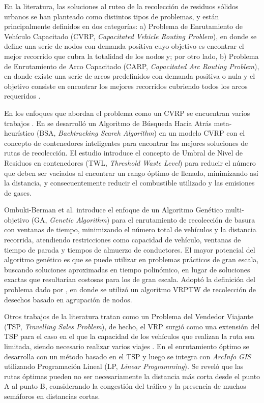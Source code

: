\documentclass[spanish, conference]{IEEEtran}
\begin{document}
En la literatura, las soluciones al ruteo de la recolección de residuos sólidos urbanos se han planteado como distintos tipos de problemas, y están principalmente definidos en dos categorías: a) Problema de Enrutamiento de Vehículo Capacitado (CVRP, \textit{Capacitated Vehicle Routing Problem}), en donde se define una serie de nodos con demanda positiva cuyo objetivo es encontrar el mejor recorrido que cubra la totalidad de los nodos y; por otro lado, b) Problema de Enrutamiento de Arco Capacitado (CARP, \textit{Capacitated Arc Routing Problem}), en donde existe una serie de arcos predefinidos con demanda positiva o nula y el objetivo consiste en encontrar los mejores recorridos cubriendo todos los arcos requeridos \cite{Tirkolaee2018ATime}.

En los enfoques que abordan el problema como un CVRP se encuentran varios trabajos \cite{Akhtar2017BacktrackingOptimization,Ombuki-Berman2007WASTEALGORITHMS,Kim2006WasteWindows,Billa2014GISOptimization,Karadimas2007OptimalAlgorithm}. En \cite{Akhtar2017BacktrackingOptimization} se desarrolló un Algoritmo de Búsqueda Hacia Atrás meta-heurístico (BSA, \textit{Backtracking Search Algorithm}) en un modelo CVRP con el concepto de contenedores inteligentes para encontrar las mejores soluciones de rutas de recolección. El estudio introduce el concepto de Umbral de Nivel de Residuos en contenedores (TWL, \textit{Threshold Waste Level}) para reducir el número que deben ser vaciados al encontrar un rango óptimo de llenado, minimizando así la distancia, y consecuentemente reducir el combustible utilizado y las emisiones de gases.

Ombuki-Berman et al. \cite{Ombuki-Berman2007WASTEALGORITHMS} introduce el enfoque de un Algoritmo Genético multi-objetivo (GA, \textit{Genetic Algorithm}) para el enrutamiento de recolección de basura con ventanas de tiempo, minimizando el número total de vehículos y la distancia recorrida, atendiendo restricciones como capacidad de vehículo, ventanas de tiempo de parada y tiempos de almuerzo de conductores. El mayor potencial del algoritmo genético es que se puede utilizar en problemas prácticos de gran escala, buscando soluciones aproximadas en tiempo polinómico, en lugar de soluciones exactas que resultarían costosas para los de gran escala. Adoptó la definición del problema dado por \cite{Kim2006WasteWindows}, en donde se utilizó un algoritmo VRPTW de recolección de desechos basado en agrupación de nodos.

Otros trabajos de la literatura tratan como un Problema del Vendedor Viajante (TSP, \textit{Travelling Sales Problem}), de hecho, el VRP surgió como una extensión del TSP para el caso en el que la capacidad de los vehículos que realizan la ruta sea limitada, siendo necesario realizar varios viajes \cite{CalvinoM2011CooperacionPanoramica}. En \cite{Billa2014GISOptimization} el enrutamiento óptimo se desarrolla con un método basado en el TSP y luego se integra con \textit{ArcInfo GIS} utilizando Programación Lineal (LP, \textit{Linear Programming}). Se reveló que las rutas óptimas pueden no ser necesariamente la distancia más corta desde el punto A al punto B, considerando la congestión del tráfico y la presencia de muchos semáforos en distancias cortas.
\end{document}
